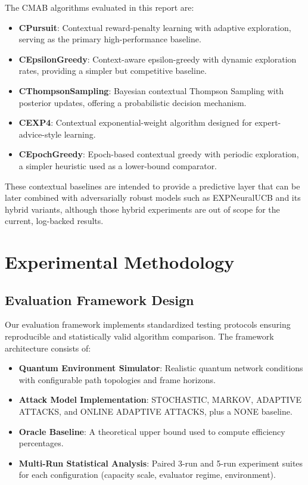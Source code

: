 \documentclass[12pt,a4paper]{article}
\begin{document}
The CMAB algorithms evaluated in this report are:

\begin{itemize}
\item \textbf{CPursuit}: Contextual reward-penalty learning with adaptive exploration, serving as the primary high-performance baseline.
\item \textbf{CEpsilonGreedy}: Context-aware epsilon-greedy with dynamic exploration rates, providing a simpler but competitive baseline.
\item \textbf{CThompsonSampling}: Bayesian contextual Thompson Sampling with posterior updates, offering a probabilistic decision mechanism.
\item \textbf{CEXP4}: Contextual exponential-weight algorithm designed for expert-advice-style learning.
\item \textbf{CEpochGreedy}: Epoch-based contextual greedy with periodic exploration, a simpler heuristic used as a lower-bound comparator.
\end{itemize}

These contextual baselines are intended to provide a predictive layer that can be later combined with adversarially robust models such as EXPNeuralUCB and its hybrid variants, although those hybrid experiments are out of scope for the current, log-backed results.

\section{Experimental Methodology}

\subsection{Evaluation Framework Design}

Our evaluation framework implements standardized testing protocols ensuring reproducible and statistically valid algorithm comparison. The framework architecture consists of:

\begin{itemize}
\item \textbf{Quantum Environment Simulator}: Realistic quantum network conditions with configurable path topologies and frame horizons.
\item \textbf{Attack Model Implementation}: STOCHASTIC, MARKOV, ADAPTIVE ATTACKS, and ONLINE ADAPTIVE ATTACKS, plus a NONE baseline.
\item \textbf{Oracle Baseline}: A theoretical upper bound used to compute efficiency percentages.
\item \textbf{Multi-Run Statistical Analysis}: Paired 3-run and 5-run experiment suites for each configuration (capacity scale, evaluator regime, environment).
\end{itemize}
\end{document}
